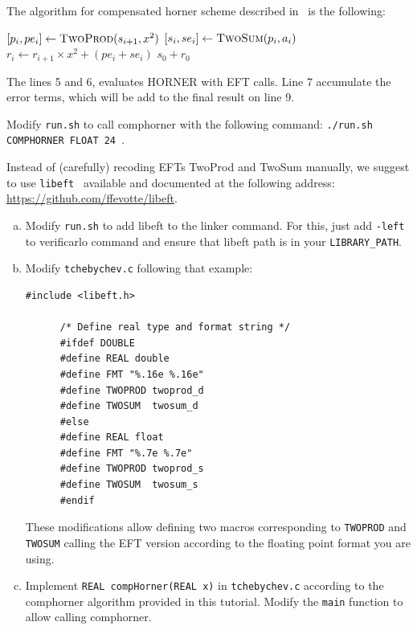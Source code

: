 \documentclass{TP}
\begin{document}
The algorithm for compensated horner scheme described in~\cite{graillat2005compensated} is the following:

\begin{algorithmic}[1]
       \State $[p_i, pe_i] \gets \text{\sc TwoProd}(s_{i+1}, x^2)$
       \State $[s_i, se_i] \gets \text{\sc TwoSum}(p_i, a_i)$
       \State $r_i \gets r_{i+1}\times x^2+(pe_i+se_i)$
    \EndFor
    \State \Return $s_0 + r_0$
  \EndProcedure
\end{algorithmic}

The lines 5 and 6, evaluates HORNER with EFT calls. Line 7 accumulate the error terms, which will be add to the final result on line 9.

\begin{question}
    \item Modify {\tt run.sh} to call comphorner with the following command: {\tt ./run.sh COMPHORNER FLOAT 24 }.
\end{question}

Instead of (carefully) recoding EFTs {\sc TwoProd} and {\sc TwoSum} manually, we suggest to use {\tt libeft}~\cite{libeft} available and documented at the following address: \url{https://github.com/ffevotte/libeft}.

\begin{question}
  \begin{enumerate}[(a)]
    \item Modify {\tt run.sh} to add libeft to the linker command. For this, just add {\tt -left} to verificarlo command and ensure that libeft path is in your  {\tt LIBRARY\_PATH}.
    \item Modify {\tt tchebychev.c} following that example:

      {
      \begin{lstlisting}[style=customC, basicstyle=\normalsize]
      #include <libeft.h>

      /* Define real type and format string */
      #ifdef DOUBLE
      #define REAL double
      #define FMT "%.16e %.16e"
      #define TWOPROD twoprod_d
      #define TWOSUM  twosum_d
      #else
      #define REAL float
      #define FMT "%.7e %.7e"
      #define TWOPROD twoprod_s
      #define TWOSUM  twosum_s
      #endif
      \end{lstlisting}
      }

     These modifications allow defining two macros corresponding to  {\tt TWOPROD} and {\tt TWOSUM} calling the EFT version according to the floating point format you are using.


    \item Implement {\tt REAL compHorner(REAL x)} in {\tt tchebychev.c} according to the comphorner algorithm provided in this tutorial. Modify the {\tt main} function to allow calling comphorner.
    \end{enumerate}
\end{question}
\end{document}
